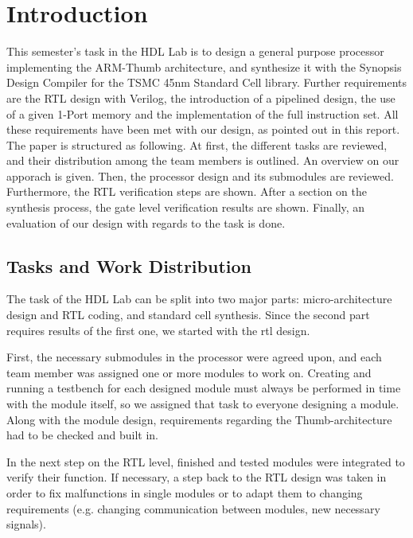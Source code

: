 \chapter{Introduction}
\label{cha:introduction}

This semester's task in the HDL Lab is to design a general purpose processor implementing the ARM-Thumb architecture, and synthesize it with the Synopsis Design Compiler for the TSMC 45nm Standard Cell library. Further requirements are the RTL design with Verilog, the introduction of a pipelined design, the use of a given 1-Port memory and the implementation of the full instruction set. All these requirements have been met with our design, as pointed out in this report.\\ The paper is structured as following. At first, the different tasks are reviewed, and their distribution among the team members is outlined. An overview on our apporach is given. Then, the processor design and its submodules are reviewed. Furthermore, the RTL verification steps are shown. After a section on the synthesis process, the gate level verification results are shown. Finally, an evaluation of our design with regards to the task is done.

\section{Tasks and Work Distribution}
\label{sec:tasksandworkdistribution}

The task of the HDL Lab can be split into two major parts: micro-architecture design and RTL coding, and standard cell synthesis. Since the second part requires results of the first one, we started with the rtl design. 

First, the necessary submodules in the processor were agreed upon, and each team member was assigned one or more modules to work on. Creating and running a testbench for each designed module must always be performed in time with the module itself, so we assigned that task to everyone designing a module. Along with the module design, requirements regarding the Thumb-architecture had to be checked and built in. 

In the next step on the RTL level, finished and tested modules were integrated to verify their function. If necessary, a step back to the RTL design was taken in order to fix malfunctions in single modules or to adapt them to changing requirements (e.g. changing communication between modules, new necessary signals).

